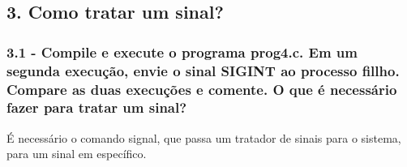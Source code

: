 \subsection*{3. Como tratar um sinal?}

\subsubsection{3.1 - Compile e execute o programa prog4.c. Em um segunda execução, envie o sinal SIGINT ao processo ﬁllho. Compare as duas execuções e comente. O que é necessário fazer para tratar um sinal?}

\vspace{-0.5em}
\begin{minipage}{\textwidth}
  \hspace{-1em}
  \centering
  
  \label{prog4}
  \hspace{1em}
\end{minipage}
\vspace{0.5em}

É necessário o comando signal, que passa um tratador de sinais para o sistema, para um sinal em específico.

